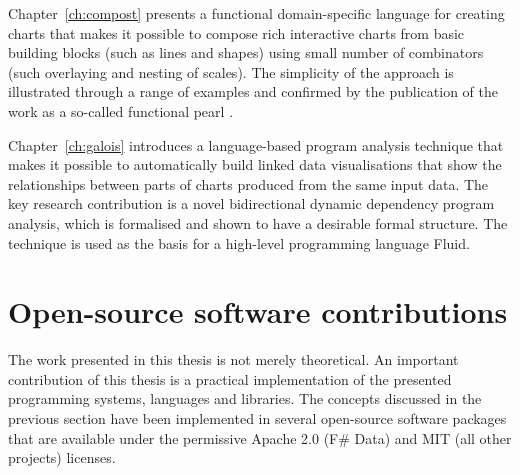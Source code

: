 \documentclass[fleqn,11pt]{report}
\theoremstyle{definition}
\begin{document}
Chapter~\ref{ch:compost} presents a functional domain-specific language for creating charts that
makes it possible to compose rich interactive charts from basic building blocks (such as lines
and shapes) using small number of combinators (such overlaying and nesting of scales).
The simplicity of the approach is illustrated through a range of examples and confirmed by the
publication of the work as a so-called functional pearl \citep{gibbons-2010-pearl}.

Chapter~\ref{ch:galois} introduces a language-based program analysis technique that makes it
possible to automatically build linked data visualisations that show the relationships between parts
of charts produced from the same input data. The key research contribution is a novel bidirectional
dynamic dependency program analysis, which is formalised and shown to have a desirable formal
structure. The technique is used as the basis for a high-level programming language Fluid.

\section{Open-source software contributions}

The work presented in this thesis is not merely theoretical. An important contribution
of this thesis is a practical implementation of the presented programming systems, languages
and libraries. The concepts discussed in the previous section have been implemented in
several open-source software packages that are available under the permissive Apache 2.0 (F\# Data)
and MIT (all other projects) licenses.
\end{document}
